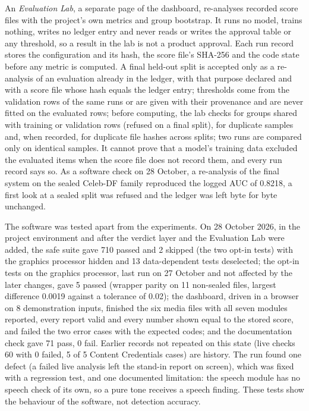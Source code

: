 \documentclass[conference,a4paper]{IEEEtran_nodash}
\begin{document}
An \emph{Evaluation Lab}, a separate page of the dashboard, re-analyses recorded
score files with the project's own metrics and group bootstrap. It runs no model,
trains nothing, writes no ledger entry and never reads or writes the approval
table or any threshold, so a result in the lab is not a product approval. Each
run record stores the configuration and its hash, the score file's SHA-256 and
the code state before any metric is computed. A final held-out split is accepted
only as a re-analysis of an evaluation already in the ledger, with that purpose
declared and with a score file whose hash equals the ledger entry; thresholds
come from the validation rows of the same runs or are given with their
provenance and are never fitted on the evaluated rows; before computing, the lab
checks for groups shared with training or validation rows (refused on a final
split), for duplicate samples and, when recorded, for duplicate file hashes
across splits; two runs are compared only on identical samples. It cannot prove
that a model's training data excluded the evaluated items when the score file
does not record them, and every run record says so. As a software check on
28 October, a re-analysis of the final system on the sealed Celeb-DF family
reproduced the logged AUC of 0.8218, a first look at a sealed split was refused
and the ledger was left byte for byte unchanged. %

The software was tested apart from the experiments. On 28 October 2026, in the
project environment and after the verdict layer and the Evaluation Lab were
added, the safe suite gave 710 passed and 2 skipped (the two opt-in tests) with
the graphics processor hidden and 13 data-dependent tests deselected; the opt-in
tests on the graphics processor, last run on 27 October and not affected by the
later changes, gave 5 passed (wrapper parity on 11 non-sealed files, largest
difference 0.0019 against a tolerance of 0.02); the dashboard, driven in a
browser on 8 demonstration inputs, finished the six media files with all seven
modules reported, every report valid and every number shown equal to the stored
score, and failed the two error cases with the expected codes; and the
documentation check gave 71 pass, 0 fail. Earlier records not repeated on this state (live checks 60 with 0
failed, 5 of 5 Content Credentials cases) are history. The run found one defect
(a failed live analysis left the stand-in report on screen), which was fixed with
a regression test, and one documented limitation: the speech module has no
speech check of its own, so a pure tone receives a speech finding. These tests
show the behaviour of the software, not detection accuracy. %
\end{document}
